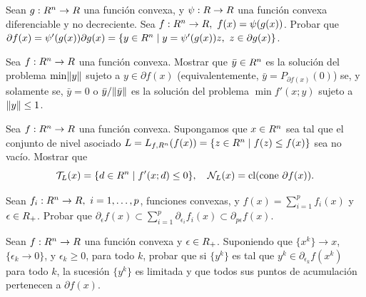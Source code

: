 \begin{exercise}\label{v1:ejer:3.4.34}
 Sean $g: R^n \to R$ una función convexa, y $\psi: R \to R$ una función convexa diferenciable y no decreciente. Sea $f: R^n \to R, \ f(x) = \psi(g(x))$. Probar que $\partial f(x) = \psi'(g(x)) \partial g(x) = \{ y \in R^n \mid y = \psi'(g(x))z, \ z \in \partial g(x) \}$.
\end{exercise}

\begin{exercise}\label{v1:ejer:3.4.35}
 Sea $f: R^n \to R$ una función convexa. Mostrar que $\bar{y} \in R^n$ es la solución del problema $\min \lVert y\rVert$ sujeto a $y \in \partial f(x)$ (equivalentemente, $\bar{y} = P_{\partial f(x)}(0)$) se, y solamente se, $\bar{y} = 0$ o $\bar{y}/\lVert\bar{y}\rVert$ es la solución del problema $\min f'(x; y)$ sujeto a $\lVert y\rVert \le 1$.
\end{exercise}

\begin{exercise}\label{v1:ejer:3.4.36}
 Sea $f: R^n \to R$ una función convexa. Supongamos que $x \in R^n$ sea tal que el conjunto de nivel asociado $L = L_{f,R^n}(f(x)) = \{ z \in R^n \mid f(z) \le f(x) \}$ sea no vacío. Mostrar que
 \[
 \mathcal{T}_L(x) = \{ d \in R^n \mid f'(x; d) \le 0 \}, \quad \mathcal{N}_L(x) = \operatorname{cl}(\text{cone } \partial f(x)).
 \]
\end{exercise}

\begin{exercise}\label{v1:ejer:3.4.37}
 Sean $f_i: R^n \to R, \ i=1,\dots,p$, funciones convexas, y $f(x) = \sum_{i=1}^p f_i(x)$ y $\epsilon \in R_+$. Probar que $\partial_\epsilon f(x) \subset \sum_{i=1}^p \partial_{\epsilon_i} f_i(x) \subset \partial_{p\epsilon} f(x)$.
\end{exercise}

\begin{exercise}\label{v1:ejer:3.4.38}
 Sean $f: R^n \to R$ una función convexa y $\epsilon \in R_+$. Suponiendo que $\{x^k\} \to x$, $\{ \epsilon_k \to 0 \}$, y $\epsilon_k \ge 0$, para todo $k$, probar que si $\{y^k\}$ es tal que $y^k \in \partial_{\epsilon_k} f(x^k)$ para todo $k$, la sucesión $\{y^k\}$ es limitada y que todos sus puntos de acumulación pertenecen a $\partial f(x)$.
\end{exercise}

